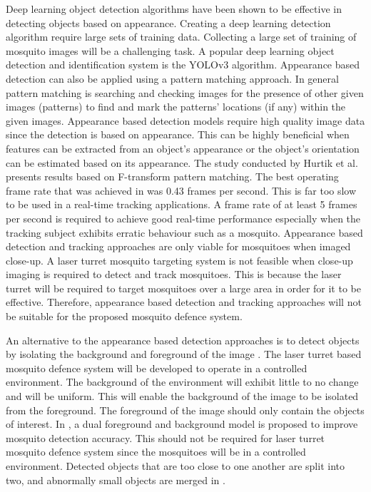 Deep learning object detection algorithms have been shown to be effective in detecting objects based on appearance. Creating a deep learning detection algorithm require large sets of training data. Collecting a large set of training of mosquito images will be a challenging task. A popular deep learning object detection and identification system is the YOLOv3 algorithm. Appearance based detection can also be applied using a pattern matching approach. In general pattern matching is searching and checking images for the presence of other given images (patterns) to find and mark the patterns' locations (if any) within the given images. Appearance based detection models require high quality image data since the detection is based on appearance. This can be highly beneficial when features can be extracted from an object's appearance or the object's orientation can be estimated based on its appearance. The study conducted by Hurtik et al. \cite{Hurtik2018} presents results based on F-transform pattern matching. The best operating frame rate that was achieved in \cite{Hurtik2018} was 0.43 frames per second. This is far too slow to be used in a real-time tracking applications. A frame rate of at least 5 frames per second is required to achieve good real-time performance especially when the tracking subject exhibits erratic behaviour such as a mosquito. Appearance based detection and tracking approaches are only viable for mosquitoes when imaged close-up. A laser turret mosquito targeting system is not feasible when close-up imaging is required to detect and track mosquitoes. This is because the laser turret will be required to target mosquitoes over a large area in order for it to be effective. Therefore, appearance based detection and tracking approaches will not be suitable for the proposed mosquito defence system.

An alternative to the appearance based detection approaches is to detect objects by isolating the background and foreground of the image \cite{Liang2016}. The laser turret based mosquito defence system will be developed to operate in a controlled environment. The background of the environment will exhibit little to no change and will be uniform. This will enable the background of the image to be isolated from the foreground. The foreground of the image should only contain the objects of interest. In \cite{Bao2018}, a dual foreground and background model is proposed to improve mosquito detection accuracy. This should not be required for laser turret mosquito defence system since the mosquitoes will be in a controlled environment. Detected objects that are too close to one another are split into two, and abnormally small objects are merged in \cite{Bao2018}.

